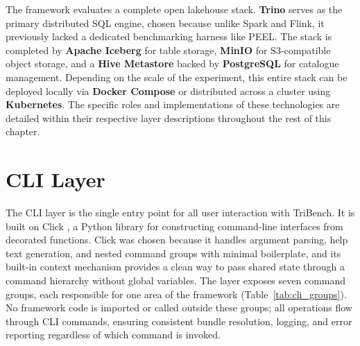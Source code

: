 \documentclass{l4proj}
\begin{document}
The framework evaluates a complete open lakehouse stack. \textbf{Trino} serves as the primary distributed SQL engine, chosen because unlike Spark and Flink, it previously lacked a dedicated benchmarking harness like PEEL. The stack is completed by \textbf{Apache Iceberg} for table storage, \textbf{MinIO} for S3-compatible object storage, and a \textbf{Hive Metastore} backed by \textbf{PostgreSQL} for catalogue management. Depending on the scale of the experiment, this entire stack can be deployed locally via \textbf{Docker Compose} or distributed across a cluster using \textbf{Kubernetes}. The specific roles and implementations of these technologies are detailed within their respective layer descriptions throughout the rest of this chapter.







\section{CLI Layer}
\label{sec:cli_layer}

The CLI layer is the single entry point for all user interaction with TriBench. It is built on Click \citep{click}, a Python library for constructing command-line interfaces from decorated functions. Click was chosen because it handles argument parsing, help text generation, and nested command groups with minimal boilerplate, and its built-in context mechanism provides a clean way to pass shared state through a command hierarchy without global variables. The layer exposes seven command groups, each responsible for one area of the framework (Table~\ref{tab:cli_groups}). No framework code is imported or called outside these groups; all operations flow through CLI commands, ensuring consistent bundle resolution, logging, and error reporting regardless of which command is invoked.
\end{document}

